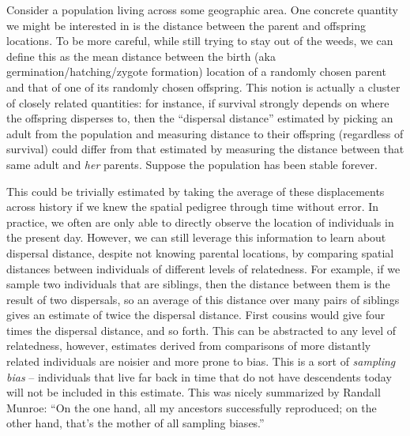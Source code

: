 \documentclass{ar-1col}
\begin{document}
Consider a population living across some geographic area.
One concrete quantity we might be interested in is 
the distance between the parent and offspring locations.
To be more careful, 
while still trying to stay out of the weeds, 
we can define this as the mean distance between the 
birth (aka germination/hatching/zygote formation)
location of a randomly chosen parent 
and that of one of its randomly chosen offspring.
This notion is actually a cluster of closely related quantities:
for instance, if survival strongly depends on where the offspring disperses to,
then the ``dispersal distance'' estimated by picking an adult from the population
and measuring distance to their offspring (regardless of survival)
could differ from that estimated by measuring the distance between that same adult
and \emph{her} parents.
Suppose the population has been stable forever.


This could be trivially estimated by taking 
the average of these displacements across history 
if we knew the spatial pedigree through time without error.
In practice, we often are only able to directly observe 
the location of individuals in the present day.
However, we can still leverage this information to learn about dispersal distance,
despite not knowing parental locations, 
by comparing spatial distances between individuals of different levels of relatedness.
For example, if we sample two individuals that are siblings,
then the distance between them is the result of two dispersals,
so an average of this distance over many pairs of siblings gives an estimate of twice the dispersal distance.
First cousins would give four times the dispersal distance, and so forth.
This can be abstracted to any level of relatedness,
however, estimates derived from comparisons of more distantly related individuals
are noisier and more prone to bias.
This is a sort of \emph{sampling bias} --
individuals that live far back in time that do not have descendents today
will not be included in this estimate.
This was nicely summarized by Randall Munroe: ``On the one hand, all my ancestors successfully reproduced; on the other hand, that's the mother of all sampling biases.''
\end{document}
